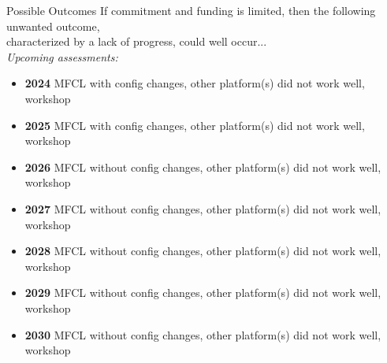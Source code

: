 \documentclass[aspectratio=169]{beamer}
\begin{document}

\begin{frame}[plain]
\end{frame}


\begin{frame}{Possible Outcomes}\small
  If commitment and funding is limited, then the following unwanted outcome,\\
  characterized by a lack of progress, could well occur...\\[2ex]
  \textit{Upcoming assessments:}
  \begin{itemize}
    \item[] {\bf 2024} MFCL with config changes, other platform(s) did not work
    well, workshop
    \item[] {\bf 2025} MFCL with config changes, other platform(s) did not work
    well, workshop
    \item[] {\bf 2026} MFCL without config changes, other platform(s) did not
    work well, workshop
    \item[] {\bf 2027} MFCL without config changes, other platform(s) did not
    work well, workshop
    \item[] {\bf 2028} MFCL without config changes, other platform(s) did not
    work well, workshop
    \item[] {\bf 2029} MFCL without config changes, other platform(s) did not
    work well, workshop
    \item[] {\bf 2030} MFCL without config changes, other platform(s) did not
    work well, workshop
  \end{itemize}
\end{frame}

\end{document}
